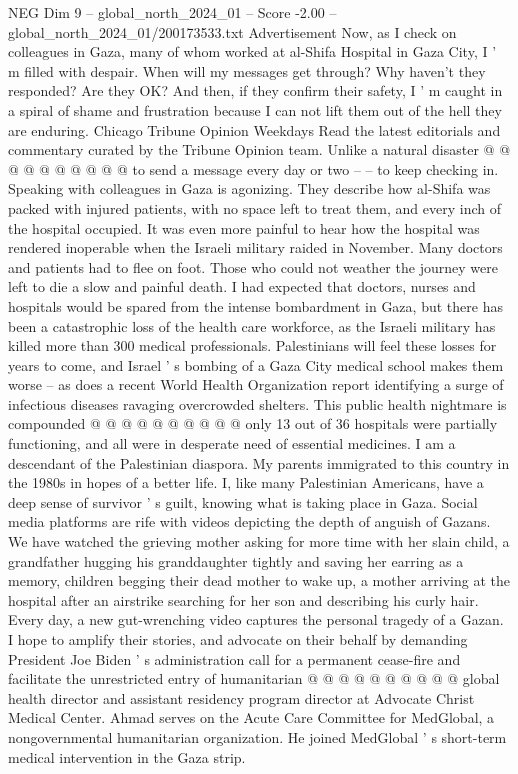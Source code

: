\begin{textsample}{NEG Dim 9 – global\_north\_2024\_01 – Score -2.00 – global\_north\_2024\_01/200173533.txt}
Advertisement Now, as I check on colleagues in Gaza, many of whom worked at al-Shifa Hospital in Gaza City, I ' m filled with despair.
When will my messages get through?
Why haven't they responded?
Are they OK?
And then, if they confirm their safety, I ' m caught in a spiral of shame and frustration because I can not lift them out of the hell they are enduring.
Chicago Tribune Opinion Weekdays Read the latest editorials and commentary curated by the Tribune Opinion team.
Unlike a natural disaster @ @ @ @ @ @ @ @ @ @ to send a message every day or two -- -- to keep checking in.
Speaking with colleagues in Gaza is agonizing.
They describe how al-Shifa was packed with injured patients, with no space left to treat them, and every inch of the hospital occupied.
It was even more painful to hear how the hospital was rendered inoperable when the Israeli military raided in November.
Many doctors and patients had to flee on foot.
Those who could not weather the journey were left to die a slow and painful death.
I had expected that doctors, nurses and hospitals would be spared from the intense bombardment in Gaza, but there has been a catastrophic loss of the health care workforce, as the Israeli military has killed more than 300 medical professionals.
Palestinians will feel these losses for years to come, and Israel ' s bombing of a Gaza City medical school makes them worse -- as does a recent World Health Organization report identifying a surge of infectious diseases ravaging overcrowded shelters.
This public health nightmare is compounded @ @ @ @ @ @ @ @ @ @ only 13 out of 36 hospitals were partially functioning, and all were in desperate need of essential medicines.
I am a descendant of the Palestinian diaspora.
My parents immigrated to this country in the 1980s in hopes of a better life.
I, like many Palestinian Americans, have a deep sense of survivor ' s guilt, knowing what is taking place in Gaza.
Social media platforms are rife with videos depicting the depth of anguish of Gazans.
We have watched the grieving mother asking for more time with her slain child, a grandfather hugging his granddaughter tightly and saving her earring as a memory, children begging their dead mother to wake up, a mother arriving at the hospital after an airstrike searching for her son and describing his curly hair.
Every day, a new gut-wrenching video captures the personal tragedy of a Gazan.
I hope to amplify their stories, and advocate on their behalf by demanding President Joe Biden ' s administration call for a permanent cease-fire and facilitate the unrestricted entry of humanitarian @ @ @ @ @ @ @ @ @ @ global health director and assistant residency program director at Advocate Christ Medical Center.
Ahmad serves on the Acute Care Committee for MedGlobal, a nongovernmental humanitarian organization.
He joined MedGlobal ' s short-term medical intervention in the Gaza strip.

\end{textsample}
